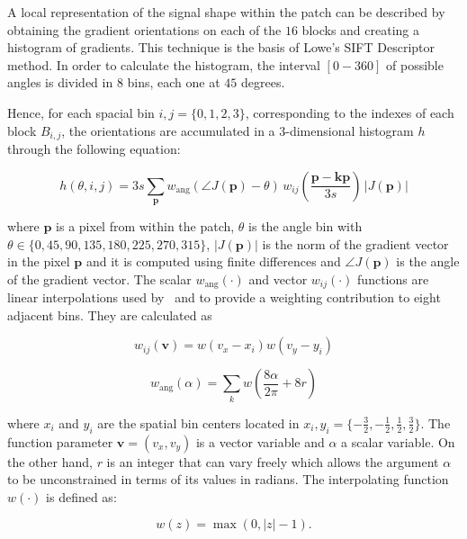 A local representation of the signal shape within the patch can be described by obtaining the gradient orientations on each of the $16$ blocks and creating a histogram of gradients.  This technique is the basis of Lowe's SIFT Descriptor method. In order to calculate the histogram, the interval $[0-360]$ of possible angles is divided in $8$ bins, each one at $45$ degrees.

 Hence, for each spacial bin $ i,j = \{0,1,2,3\} $, corresponding to the indexes of each block $B_{i,j}$,  the orientations are accumulated in a  $3$-dimensional histogram $h$ through the following equation: 
 

\begin{equation}
 h(\theta,i,j) = 3 s \sum_{\mathbf{p}} w_\mathrm{ang}(\angle J(\mathbf{p}) - \theta)\, w_{ij}\left(\frac{\mathbf{p} - \mathbf{kp}}{3 s}\right)\, |J(\mathbf{p})|
\label{eq:histogram}
\end{equation}

\noindent  where $\mathbf{p}$ is a pixel from within the patch,  $\theta$ is the angle bin with $ \theta \in \{0, 45, 90, 135, 180, 225, 270, 315\} $,  $ |J(\mathbf{p})| $ is the norm of the gradient vector in the pixel $\mathbf{p}$ and it is computed using finite differences and $\angle J(\mathbf{p}) $ is the angle of the gradient vector.  The scalar $ w_\mathrm{ang}(\cdot) $  and vector $ w_{ij}(\cdot) $ functions are linear interpolations used by~\cite{Lowe2004} and \cite{Vedaldi2010} to provide a weighting contribution to eight adjacent bins.  They are calculated as  

\begin{equation}
 w_{ij}(\mathbf{v}) = w( v_x - x_i ) w( v_y - y_i ) 
\label{eq:ij}
\end{equation}

\begin{equation}
 w_\mathrm{ang}(\alpha) = \sum_{k} w( \frac{8\alpha}{2\pi} + 8r)
\label{eq:wang}
\end{equation}

\noindent where $x_i$ and $y_i$ are the spatial bin centers located in $ x_i,y_i = \{-\frac{3}{2},-\frac{1}{2},\frac{1}{2},\frac{3}{2}\} $. The function parameter $\mathbf{v} = ( v_x, v_y ) $ is a vector variable and $\alpha$ a scalar variable.  On the other hand, $r$ is an integer that can vary freely which allows the argument $\alpha$ to be unconstrained in terms of its values in radians. The interpolating function $w(\cdot)$ is defined as:

\begin{equation}
 w(z) = \max(0,|z|-1).
\label{eq:weighting}
\end{equation}

